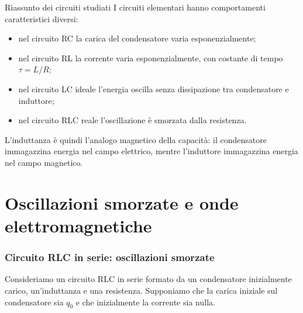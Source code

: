\documentclass[a4paper]{article}
\begin{document}
\begin{snippetproposition}{Riassunto dei circuiti studiati}
I circuiti elementari hanno comportamenti caratteristici diversi:
\begin{itemize}
    \item nel circuito RC la carica del condensatore varia esponenzialmente;
    \item nel circuito RL la corrente varia esponenzialmente, con costante di tempo \(\tau=L/R\);
    \item nel circuito LC ideale l'energia oscilla senza dissipazione tra condensatore e induttore;
    \item nel circuito RLC reale l'oscillazione è smorzata dalla resistenza.
\end{itemize}
\end{snippetproposition}

L'induttanza è quindi l'analogo magnetico della capacità: il condensatore immagazzina energia nel campo elettrico, mentre l'induttore immagazzina energia nel campo magnetico.

\pagebreak
\part{Oscillazioni smorzate e onde elettromagnetiche}

\section{Circuito RLC in serie: oscillazioni smorzate}

Consideriamo un circuito RLC in serie formato da un condensatore inizialmente carico, un'induttanza e una resistenza. Supponiamo che la carica iniziale sul condensatore sia \(q_0\) e che inizialmente la corrente sia nulla.

\begin{center}
\end{center}
\end{document}
